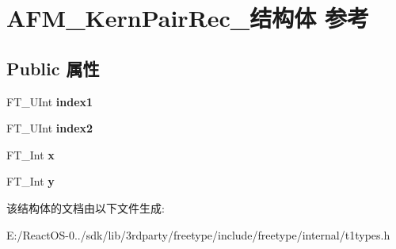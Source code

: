 \hypertarget{struct_a_f_m___kern_pair_rec__}{}\section{A\+F\+M\+\_\+\+Kern\+Pair\+Rec\+\_\+结构体 参考}
\label{struct_a_f_m___kern_pair_rec__}
\subsection*{Public 属性}
\begin{DoxyCompactItemize}
\item 
\mbox{\label{struct_a_f_m___kern_pair_rec___afe63c264dd0b4eab36185b1cb2997316}} 
F\+T\+\_\+\+U\+Int {\bfseries index1}
\item 
\mbox{\label{struct_a_f_m___kern_pair_rec___a2ed7998a1287c64ca6074ecfe740116e}} 
F\+T\+\_\+\+U\+Int {\bfseries index2}
\item 
\mbox{\label{struct_a_f_m___kern_pair_rec___a4b7f90a0e17ed89353fec14ddb29fa12}} 
F\+T\+\_\+\+Int {\bfseries x}
\item 
\mbox{\label{struct_a_f_m___kern_pair_rec___aa177aa612e79701261eba72c76ea3f08}} 
F\+T\+\_\+\+Int {\bfseries y}
\end{DoxyCompactItemize}


该结构体的文档由以下文件生成\+:\begin{DoxyCompactItemize}
\item 
E\+:/\+React\+O\+S-\/0../sdk/lib/3rdparty/freetype/include/freetype/internal/t1types.\+h\end{DoxyCompactItemize}
